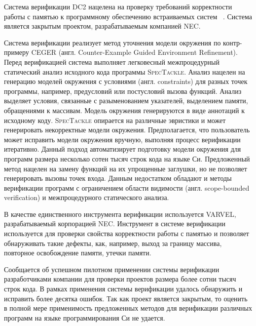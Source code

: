 Система верификации DC2 нацелена на проверку требований корректности работы с памятью к программному обеспечению встраиваемых систем ~\cite{Ivancic:2015:SSS}.
Система является закрытым проектом, разрабатываемым компанией NEC.

Система верификации реализует метод уточнения модели окружения по контр-примеру CEGER (англ. Counter-Example Guided Environment Refinement).
Перед верификацией система выполняет легковесный межпроцедурный статический анализ исходного кода программы \textsc{SpecTackle}.
Анализ нацелен на генерацию моделей окружения с условиями (англ. constraints) для разных точек программы, например, предусловий или постусловий вызова функций.
Анализ выделяет условия, связанные с разыменованием указателей, выделением памяти, обращениями к массивам.
Модель окружения генерируются в виде аннотаций к исходному коду.
\textsc{SpecTackle} опирается на различные эвристики и может генерировать некорректные модели окружения.
Предполагается, что пользователь может исправить модели окружения вручную, выполняя процесс верификации итеративно.
Данный подход автоматизирует подготовку модели окружения для программ размера несколько сотен тысяч строк кода на языке Си.
Предложенный метод нацелен на замену функций на их упрощенные заглушки, но не позволяет генерировать вызовы точек входа.
Данным недостатком обладают и методы верификации программ с ограничением области видимости (англ. scope-bounded verification) и межпроцедурного статического анализа.

В качестве единственного инструмента верификации используется VARVEL, разрабатываемый корпорацией NEC.
Инструмент в системе верификации используется для проверки свойства корректности работы с памятью и позволяет обнаруживать такие дефекты, как, например, выход за границу массива, повторное освобождение памяти, утечки памяти.

Сообщается об успешном пилотном применении системы верификации разработчиками компании для проверки проектов размера более сотни тысяч строк кода.
В рамках применения системы верификации удалось обнаружить и исправить более десятка ошибок. 
Так как проект является закрытым, то оценить в полной мере применимость предложенных методов для верификации различных программ на языке программирования Си не удается.

